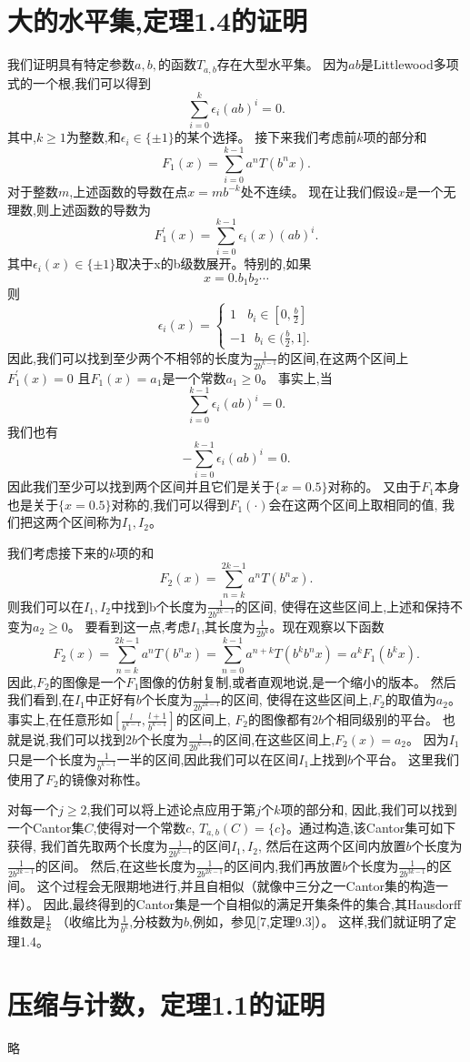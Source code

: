 \section{大的水平集,定理1.4的证明}

我们证明具有特定参数$a,b,$的函数$T_{a,b}$存在大型水平集。
因为$ab$是Littlewood多项式的一个根,我们可以得到
$$
\sum_{i=0}^k\epsilon_i(ab)^i=0.
$$
其中,$k\ge1$为整数,和$\epsilon_i\in\{\pm1\}$的某个选择。
接下来我们考虑前$k$项的部分和
$$
F_1(x)=\sum_{i=0}^{k-1}a^nT(b^nx).
$$
对于整数$m$,上述函数的导数在点$x=mb^{-k}$处不连续。
现在让我们假设$x$是一个无理数,则上述函数的导数为
$$
F_1^\prime(x)=\sum_{i=0}^{k-1}\epsilon_i(x)(ab)^i.
$$
其中$\epsilon_i(x)\in\{\pm1\}$取决于x的b级数展开。特别的,如果
$$
x=0.b_1b_2\cdots
$$
则
$$
\epsilon_i(x)=\begin{cases}1~~~~b_i\in[0,\frac{b}{2}]\\-1~~~b_i\in(\frac{b}{2},1].\end{cases}
$$
因此,我们可以找到至少两个不相邻的长度为$\frac{1}{2b^{k-1}}$的区间,在这两个区间上$F_1^\prime(x)=0$
且$F_1(x)=a_1$是一个常数$a_1\ge0$。
事实上,当
$$
\sum_{i=0}^{k-1}\epsilon_i(ab)^i=0.
$$
我们也有
$$
-\sum_{i=0}^{k-1}\epsilon_i(ab)^i=0.
$$
因此我们至少可以找到两个区间并且它们是关于$\{x=0.5\}$对称的。
又由于$F_1$本身也是关于$\{x=0.5\}$对称的,我们可以得到$F_1(\cdot)$会在这两个区间上取相同的值,
我们把这两个区间称为$I_1,I_2$。

我们考虑接下来的$k$项的和
$$
F_2(x)=\sum_{n=k}^{2k-1}a^nT(b^nx).
$$
则我们可以在$I_1,I_2$中找到b个长度为$\frac{1}{2b^{2k-1}}$的区间,
使得在这些区间上,上述和保持不变为$a_2\ge0$。
要看到这一点,考虑$I_1$,其长度为$\frac{1}{2b^k}$。现在观察以下函数
$$
F_2(x)=\sum_{n=k}^{2k-1}a^nT(b^nx)=\sum_{n=0}^{k-1}a^{n+k}T(b^kb^nx)=a^kF_1(b^kx).
$$
因此,$F_2$的图像是一个$F_1$图像的仿射复制,或者直观地说,是一个缩小的版本。
然后我们看到,在$I_1$中正好有$b$个长度为$\frac{1}{2b^{2k-1}}$的区间,
使得在这些区间上,$F_2$的取值为$a_2$。
事实上,在任意形如$[\frac{l}{b^{k-1}},\frac{l+1}{b^{k-1}}]$的区间上,
$F_2$的图像都有$2b$个相同级别的平台。
也就是说,我们可以找到$2b$个长度为$\frac{1}{2b^{k-1}}$的区间,在这些区间上,$F_2(x)=a_2$。
因为$I_1$只是一个长度为$\frac{1}{b^{k-1}}$一半的区间,因此我们可以在区间$I_1$上找到$b$个平台。
这里我们使用了$F_2$的镜像对称性。

对每一个$j\ge2$,我们可以将上述论点应用于第$j$个$k$项的部分和,
因此,我们可以找到一个Cantor集$C$,使得对一个常数$c$,
$T_{a,b}(C)=\{c\}$。通过构造,该Cantor集可如下获得,
我们首先取两个长度为$\frac{1}{2b^{k-1}}$的区间$I_1,I_2$,
然后在这两个区间内放置$b$个长度为$\frac{1}{2b^{2k-1}}$的区间。
然后,在这些长度为$\frac{1}{2b^{2k-1}}$的区间内,我们再放置$b$个长度为$\frac{1}{2b^{3k-1}}$的区间。
这个过程会无限期地进行,并且自相似（就像中三分之一Cantor集的构造一样）。
因此,最终得到的Cantor集是一个自相似的满足开集条件的集合,其Hausdorff维数是$\frac{1}{k}$
（收缩比为$\frac{1}{b^k}$,分枝数为$b$,例如，参见[7,定理9.3]）。
这样,我们就证明了定理1.4。
\section{压缩与计数，定理1.1的证明}
略
\nocite{*}
\begingroup
    \printbibliography[title={外文翻译参考文献}]
\endgroup
